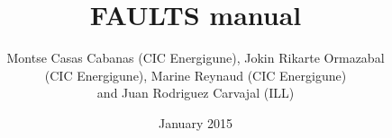 \documentclass[a4paper,11pt]{report}
\begin{document}
\title{\Huge\bf FAULTS manual}
\author{Montse Casas Cabanas (CIC Energigune), Jokin Rikarte Ormazabal \\
(CIC Energigune), Marine Reynaud (CIC Energigune) \\
and Juan Rodriguez Carvajal (ILL)}
\date{January 2015}
\maketitle
\tableofcontents



%
%
%
\end{document}
